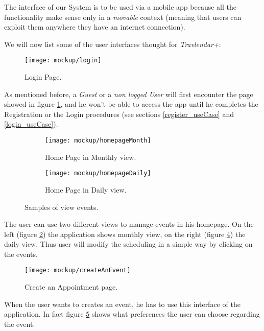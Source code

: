 The interface of our System is to be used via a mobile app because all the functionality make sense only in a \textit{movable} context (meaning that users can exploit them anywhere they have an internet connection).

We will now list some of the user interfaces thought for \textit{Travlendar+}:

\begin{figure}[h]
	\texttt{[image: mockup/login]}
	\centering
	\caption{Login Page.}
	\label{fig:login}
\end{figure}
	As mentioned before, a \textit{Guest} or a \textit{non logged User} will first encounter the page showed in figure \ref{fig:login}, and he won't be able to access the app until he completes the Registration or the Login procedures (see sections \ref{register_useCase} and \ref{login_useCase}).



\begin{figure}[H]
	\begin{subfigure}{0.5\textwidth}
		\texttt{[image: mockup/homepageMonth]} 
		\centering
		\caption{Home Page in Monthly view.}
		\label{fig:homePage_Month}
	\end{subfigure}
	\begin{subfigure}{0.5\textwidth}
		\texttt{[image: mockup/homepageDaily]} 
		\centering
		\caption{Home Page in Daily view.}
		\label{fig:homePage_Day}
	\end{subfigure}
	\caption{Samples of view events.}
\end{figure}

	The user can use two different views to manage events in his homepage. On the left (figure \ref{fig:homePage_Month}) the application shows monthly view, on the right (figure \ref{fig:homePage_Day}) the daily view. Thus user will modify the scheduling in a simple way by clicking on the events.



\begin{figure}[H]
	\texttt{[image: mockup/createAnEvent]}
	\centering
	\caption{Create an Appointment page.}
	\label{fig:createEvent}
\end{figure}
	
	When the user wants to creates an event, he has to use this interface of the application. In fact figure \ref{fig:createEvent} shows what preferences the user can choose regarding the event.


